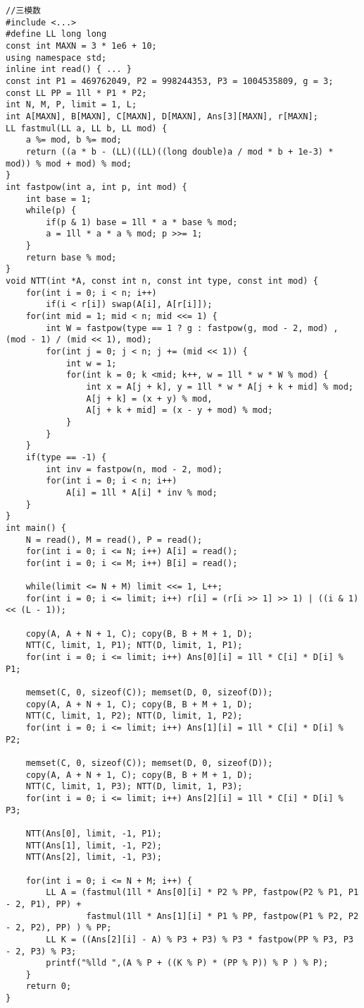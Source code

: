 \documentclass{article}
\begin{document}
\begin{lstlisting}
//三模数
#include <...>
#define LL long long
const int MAXN = 3 * 1e6 + 10;
using namespace std;
inline int read() { ... }
const int P1 = 469762049, P2 = 998244353, P3 = 1004535809, g = 3; 
const LL PP = 1ll * P1 * P2;
int N, M, P, limit = 1, L;
int A[MAXN], B[MAXN], C[MAXN], D[MAXN], Ans[3][MAXN], r[MAXN];
LL fastmul(LL a, LL b, LL mod) {
	a %= mod, b %= mod;
	return ((a * b - (LL)((LL)((long double)a / mod * b + 1e-3) * mod)) % mod + mod) % mod;
}
int fastpow(int a, int p, int mod) {
	int base = 1;
	while(p) {
		if(p & 1) base = 1ll * a * base % mod;
		a = 1ll * a * a % mod; p >>= 1;
	}
	return base % mod;
} 
void NTT(int *A, const int n, const int type, const int mod) {
	for(int i = 0; i < n; i++)
		if(i < r[i]) swap(A[i], A[r[i]]);
	for(int mid = 1; mid < n; mid <<= 1) {
		int W = fastpow(type == 1 ? g : fastpow(g, mod - 2, mod) , (mod - 1) / (mid << 1), mod);
		for(int j = 0; j < n; j += (mid << 1)) {
			int w = 1;
			for(int k = 0; k <mid; k++, w = 1ll * w * W % mod) {
				int x = A[j + k], y = 1ll * w * A[j + k + mid] % mod;
				A[j + k] = (x + y) % mod,
				A[j + k + mid] = (x - y + mod) % mod;
			}
		}
	}
	if(type == -1) {
		int inv = fastpow(n, mod - 2, mod);
		for(int i = 0; i < n; i++) 
			A[i] = 1ll * A[i] * inv % mod;
	}
}
int main() {
	N = read(), M = read(), P = read();
	for(int i = 0; i <= N; i++) A[i] = read();
	for(int i = 0; i <= M; i++) B[i] = read();
	
	while(limit <= N + M) limit <<= 1, L++;
	for(int i = 0; i <= limit; i++) r[i] = (r[i >> 1] >> 1) | ((i & 1) << (L - 1));
	
	copy(A, A + N + 1, C); copy(B, B + M + 1, D);
	NTT(C, limit, 1, P1); NTT(D, limit, 1, P1);
	for(int i = 0; i <= limit; i++) Ans[0][i] = 1ll * C[i] * D[i] % P1;
	
	memset(C, 0, sizeof(C)); memset(D, 0, sizeof(D));
	copy(A, A + N + 1, C); copy(B, B + M + 1, D);
	NTT(C, limit, 1, P2); NTT(D, limit, 1, P2);
	for(int i = 0; i <= limit; i++) Ans[1][i] = 1ll * C[i] * D[i] % P2;
	
	memset(C, 0, sizeof(C)); memset(D, 0, sizeof(D));
	copy(A, A + N + 1, C); copy(B, B + M + 1, D);
	NTT(C, limit, 1, P3); NTT(D, limit, 1, P3);
	for(int i = 0; i <= limit; i++) Ans[2][i] = 1ll * C[i] * D[i] % P3;
	
	NTT(Ans[0], limit, -1, P1);
	NTT(Ans[1], limit, -1, P2);
	NTT(Ans[2], limit, -1, P3);
	
	for(int i = 0; i <= N + M; i++) {
		LL A = (fastmul(1ll * Ans[0][i] * P2 % PP, fastpow(P2 % P1, P1 - 2, P1), PP) + 
				fastmul(1ll * Ans[1][i] * P1 % PP, fastpow(P1 % P2, P2 - 2, P2), PP) ) % PP;
		LL K = ((Ans[2][i] - A) % P3 + P3) % P3 * fastpow(PP % P3, P3 - 2, P3) % P3;
		printf("%lld ",(A % P + ((K % P) * (PP % P)) % P ) % P);		 
	}
	return 0;
}
\end{lstlisting}
\end{document}
